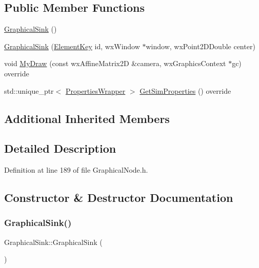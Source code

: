 \subsection*{Public Member Functions}
\begin{DoxyCompactItemize}
\item 
\hyperlink{class_graphical_sink_ab59d3cff17a43fac7fc1f364681cd35f}{Graphical\+Sink} ()
\item 
\hyperlink{class_graphical_sink_a2a70f127f23e0e4279b90c565859c7cb}{Graphical\+Sink} (\hyperlink{_graphical_element_8h_ade5fd6c85839a416577ff9de1605141e}{Element\+Key} id, wx\+Window $\ast$window, wx\+Point2\+D\+Double center)
\item 
void \hyperlink{class_graphical_sink_abac58f5bfe23ab2a799560171c036507}{My\+Draw} (const wx\+Affine\+Matrix2D \&camera, wx\+Graphics\+Context $\ast$gc) override
\item 
std\+::unique\+\_\+ptr$<$ \hyperlink{class_graphical_node_1_1_properties_wrapper}{Properties\+Wrapper} $>$ \hyperlink{class_graphical_sink_a7e8f63afb0f7ddf14c77cac9e44d30d4}{Get\+Sim\+Properties} () override
\end{DoxyCompactItemize}
\subsection*{Additional Inherited Members}


\subsection{Detailed Description}


Definition at line 189 of file Graphical\+Node.\+h.



\subsection{Constructor \& Destructor Documentation}
\mbox{\label{class_graphical_sink_ab59d3cff17a43fac7fc1f364681cd35f}} 
\subsubsection{\texorpdfstring{Graphical\+Sink()}{GraphicalSink()}\hspace{0.1cm}{\footnotesize\ttfamily [1/2]}}
{\footnotesize\ttfamily Graphical\+Sink\+::\+Graphical\+Sink (\begin{DoxyParamCaption}{ }\end{DoxyParamCaption})}




